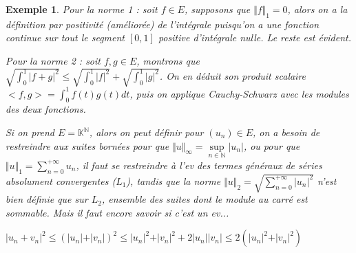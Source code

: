 \documentclass[a4paper,12pt]{book}
\newtheorem{Exe}{Exemple}[section]
\def\N{\mathbb{N}}
\def\K{\mathbb{K}}
\begin{document}
\begin{Exe}
\par Pour la norme 1 : soit $f\in E$, supposons que $\Vert f\Vert_1 = 0$, alors on a la définition par positivité (améliorée) de l'intégrale puisqu'on a une fonction continue sur tout le segment $[0,1]$ positive d'intégrale nulle. Le reste est évident.
\par Pour la norme 2 : soit $f, g\in E$, montrons que $\sqrt{\int_0^1\vert f+g\vert^2}\leq\sqrt{\int_0^1\vert f\vert^2} +\sqrt{\int_0^1\vert g\vert^2}$. On en déduit son produit scalaire $<f,g> = \int_0^1 f(t)g(t)dt$, puis on applique Cauchy-Schwarz avec les modules des deux fonctions.
\par Si on prend $E=\K^\N$, alors on peut définir pour $(u_n)\in E$, on a besoin de restreindre aux suites bornées pour que $\Vert u\Vert_\infty = \sup\limits_{n\in\N}\vert u_n\vert$, ou pour que $\Vert u\Vert_1 = \sum\limits_{n=0}^{+\infty} u_n$, il faut se restreindre à l'ev des termes généraux de séries absolument convergentes ($L_1$), tandis que la norme $\Vert u\Vert_2 = \sqrt{\sum\limits_{n=0}^{+\infty} \vert u_n\vert^2}$ n'est bien définie que sur $L_2$, ensemble des suites dont le module au carré est sommable. Mais il faut encore savoir si c'est un ev...
\par $\vert u_n+v_n\vert^2\leq (\vert u_n\vert+\vert v_n\vert)^2\leq \vert u_n\vert^2 +\vert v_n\vert^2 + 2\vert u_n\vert\vert v_n\vert\leq 2(\vert u_n\vert^2 + \vert v_n\vert^2)$
\end{Exe}
\end{document}
